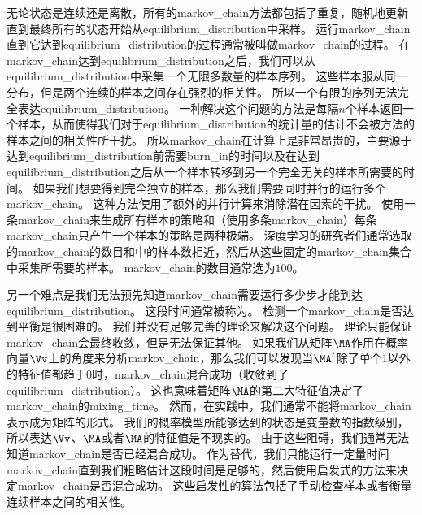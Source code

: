 无论状态是连续还是离散，所有的\gls{markov_chain}方法都包括了重复，随机地更新直到最终所有的状态开始从\gls{equilibrium_distribution}中采样。
运行\gls{markov_chain}直到它达到\gls{equilibrium_distribution}的过程通常被叫做\gls{markov_chain}的过程。
在\gls{markov_chain}达到\gls{equilibrium_distribution}之后，我们可以从\gls{equilibrium_distribution}中采集一个无限多数量的样本序列。
这些样本服从同一分布，但是两个连续的样本之间存在强烈的相关性。
所以一个有限的序列无法完全表达\gls{equilibrium_distribution}。
一种解决这个问题的方法是每隔$n$个样本返回一个样本，从而使得我们对于\gls{equilibrium_distribution}的统计量的估计不会被方法的样本之间的相关性所干扰。
所以\gls{markov_chain}在计算上是非常昂贵的，主要源于达到\gls{equilibrium_distribution}前需要\gls{burn_in}的时间以及在达到\gls{equilibrium_distribution}之后从一个样本转移到另一个完全无关的样本所需要的时间。
如果我们想要得到完全独立的样本，那么我们需要同时并行的运行多个\gls{markov_chain}。
这种方法使用了额外的并行计算来消除潜在因素的干扰。
使用一条\gls{markov_chain}来生成所有样本的策略和（使用多条\gls{markov_chain}）每条\gls{markov_chain}只产生一个样本的策略是两种极端。
深度学习的研究者们通常选取的\gls{markov_chain}的数目和中的样本数相近，然后从这些固定的\gls{markov_chain}集合中采集所需要的样本。
\gls{markov_chain}的数目通常选为$100$。

另一个难点是我们无法预先知道\gls{markov_chain}需要运行多少步才能到达\gls{equilibrium_distribution}。 
这段时间通常被称为。
检测一个\gls{markov_chain}是否达到平衡是很困难的。
我们并没有足够完善的理论来解决这个问题。
理论只能保证\gls{markov_chain}会最终收敛，但是无法保证其他。
如果我们从矩阵$\MA$作用在概率向量$\Vv$上的角度来分析\gls{markov_chain}，那么我们可以发现当$\MA^t$除了单个$1$以外的特征值都趋于$0$时，\gls{markov_chain}混合成功（收敛到了\gls{equilibrium_distribution}）。
这也意味着矩阵$\MA$的第二大特征值决定了\gls{markov_chain}的\gls{mixing_time}。
然而，在实践中，我们通常不能将\gls{markov_chain}表示成为矩阵的形式。
我们的概率模型所能够达到的状态是变量数的指数级别，所以表达$\Vv$、$\MA$或者$\MA$的特征值是不现实的。
由于这些阻碍，我们通常无法知道\gls{markov_chain}是否已经混合成功。
作为替代，我们只能运行一定量时间\gls{markov_chain}直到我们粗略估计这段时间是足够的，然后使用启发式的方法来决定\gls{markov_chain}是否混合成功。
这些启发性的算法包括了手动检查样本或者衡量连续样本之间的相关性。



\section{}
\label{sec:gibbs_sampling}

